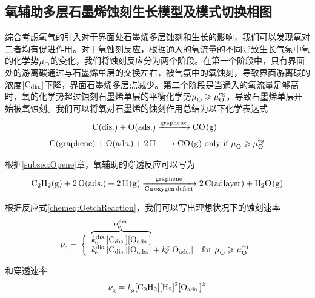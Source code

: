 \subsection{氧辅助多层石墨烯蚀刻生长模型及模式切换相图}
综合考虑氧气的引入对于界面处石墨烯多层蚀刻和生长的影响，我们可以发现氧对二者均有促进作用。对于氧蚀刻反应，根据通入的氧流量的不同导致生长气氛中氧的化学势$\mu_{\rm O}^{\rm } \it$的变化，我们将蚀刻反应分为两个阶段。在第一个阶段中，只有界面处的游离碳通过与石墨烯单层的交换左右，被气氛中的氧蚀刻，导致界面游离碳的浓度$\rm{\left[C_{dis.}\right]} \it$下降，界面石墨烯多层点减少。第二个阶段是当通入的氧流量足够高时，氧的化学势超过蚀刻石墨烯单层的平衡化学势$\mu_{\rm O}^{\rm } \it \geqslant \mu_{\rm O}^{\rm eg} \it$，导致石墨烯单层开始被氧蚀刻。我们可以将氧对石墨烯的蚀刻作用总结为以下化学表达式\chinesecolon
\begin{equation}
    \label{chemeq:OetchReaction}
    \begin{split}
        \cemb{C($\rm dis.$) + O($\rm ads.$) &->[graphene] CO(g)} \\
        \cemb{C(graphene) + O($\rm ads.$) + 2H &->[\vphantom{graphene}] CO(g) } \mbox{ only if $\muO{} \geqslant \muO{eg}$}
    \end{split}
\end{equation}

根据\ref{subsec:Opene}章，氧辅助的穿透反应可以写为\chinesecolon
\begin{align}
    \label{chemeq:OpeneReaction}
    \cemb{C2H2(g) + 2O($\rm ads.$) + 2H(g) ->[graphene][Cu oxygen defect] 2C(adlayer) + H2O(g)}
\end{align}

根据反应式\ref{chemeq:OetchReaction}，我们可以写出理想状况下的蚀刻速率\chinesecolon
\begin{equation}
    \RateV{e}{}=\rule[0ex]{0ex}{8ex}\left\{
        \begin{array}{ll}
        \smash[t]{\overbrace{\RateK{e}{dis.}\Cdis\Oads}^{\mathclap{{\mbox{\normalsize $\RateV{e}{dis.}$}}}}} & \mbox{}  \\
        \smash[b]{\RateK{e}{dis.}\Cdis\Oads+\RateK{e}{g}\Oads} & \mbox{for $\muO{} \geqslant \muO{eq}$} 
        \end{array}\right.
\end{equation}

和穿透速率\chinesecolon
\begin{equation}
    \RateV{g}{}=\RateK{g}{}\cemb{[C2H2][H2]^2}\Oads^2
\end{equation}

